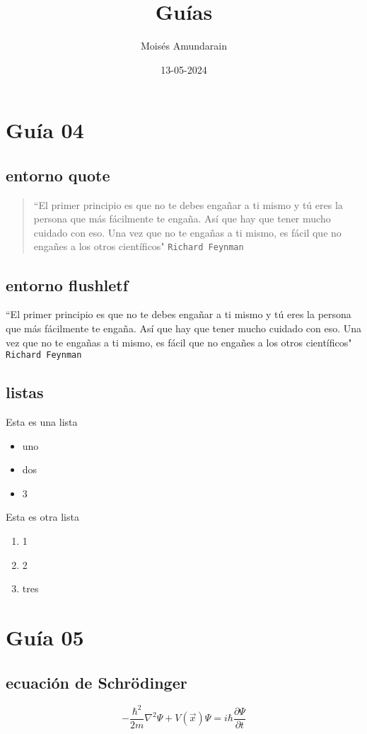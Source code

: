 \documentclass[12pt]{article}
\begin{document}
\author{Moisés Amundarain}
\title{Guías}
\date{13-05-2024}
\maketitle
\newpage
\tableofcontents
\newpage
\section{Guía 04}
\subsection{entorno quote}
\begin{quote}
``El primer principio es que no te debes engañar a ti mismo y tú eres la persona que más fácilmente te engaña. Así que hay que tener mucho cuidado con eso. Una vez que no te engañas a ti mismo, es fácil que no engañes a los otros científicos" \texttt{Richard Feynman} \cite{cita1}
\end{quote}
\subsection{entorno flushletf}
\begin{flushleft}
``El primer principio es que no te debes engañar a ti mismo y tú eres la persona que más fácilmente te engaña. Así que hay que tener mucho cuidado con eso. Una vez que no te engañas a ti mismo, es fácil que no engañes a los otros científicos" \texttt{Richard Feynman} \cite{cita2}
\end{flushleft}
\subsection{listas}
Esta es una lista
\begin{itemize}
	\item uno 
	\item dos
	\item 3
\end{itemize}
Esta es otra lista
\begin{enumerate}
	\item 1
	\item 2
	\item tres
\end{enumerate}
\newpage
\section{Guía 05}
\subsection{ecuación de Schrödinger}
\begin{equation*}
		- \frac{\hbar^2}{2m} \nabla^2 \Psi + V(\vec{x})\Psi = i\hbar \frac{\partial \Psi}{\partial t}
\end{equation*}
\end{document}
